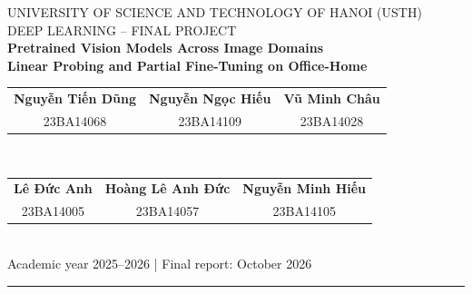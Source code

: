 \documentclass[10pt,a4paper]{article}
\begin{document}
\begin{center}
{\small UNIVERSITY OF SCIENCE AND TECHNOLOGY OF HANOI (USTH)}\\[-1mm]
{\small DEEP LEARNING -- FINAL PROJECT}\\[4mm]
{\LARGE\bfseries Pretrained Vision Models Across Image Domains\\[1mm]
Linear Probing and Partial Fine-Tuning on Office-Home}\\[4mm]
{\small
\begin{tabular}{ccc}
\textbf{Nguyễn Tiến Dũng} & \textbf{Nguyễn Ngọc Hiếu} & \textbf{Vũ Minh Châu}\\
23BA14068 & 23BA14109 & 23BA14028
\end{tabular}\\[1.5mm]
\begin{tabular}{ccc}
\textbf{ Lê Đức Anh} & \textbf{Hoàng Lê Anh Đức} & \textbf{Nguyễn Minh Hiếu}\\
 23BA14005 &   23BA14057 & 23BA14105



\end{tabular}}\\[3mm]
{\small Academic year 2025--2026 \quad | \quad Final report: October 2026}
\end{center}

\vspace{1mm}
\hrule
\vspace{2mm}

\begin{abstract}
Image classifiers often encounter visual styles that differ from their training data. This project examines how ImageNet-pretrained ResNet18 and ResNet50 transfer from real-world photographs to the Art, Clipart, and Product domains of Office-Home. We compare linear probing with partial fine-tuning of the final residual block under a source-only protocol. After removing 412 byte-identical duplicates, 15,176 images are partitioned into fixed, class-stratified training, validation, and test subsets. Only Real-World training images update model parameters; source-validation macro-F1 selects checkpoints. Four configurations are trained on a Colab Tesla T4 and evaluated on all four domains. ResNet50 linear probing achieves 82.03\% accuracy on Real-World but 37.15\% on Clipart. Partial fine-tuning raises ResNet50 Clipart accuracy to 40.87\%, while reducing accuracy on Art and Product. ResNet18 fine-tuning performs worse than linear probing in every domain. Additional analyses reveal frequent class confusions and increased high-confidence errors after fine-tuning. The findings support stronger pretrained representations but show that source-only fine-tuning does not consistently improve cross-domain reliability. Conclusions are limited to one training seed, one source domain, and fixed held-out partitions.
\end{abstract}
\end{document}
